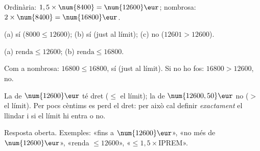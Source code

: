 \begin{solucions}
\begin{sollist}
  \item Ordinària: $1,5\times\num{8400}=\num{12600}\eur$; nombrosa:
        $2\times\num{8400}=\num{16800}\eur$.
  \item (a) sí ($\num{8000}\le\num{12600}$); \quad (b) sí (just al límit); \quad
        (c) no ($\num{12601}>\num{12600}$).
  \item (a) $\text{renda}\le\num{12600}$; \quad (b) $\text{renda}\le\num{16800}$.
  \item Com a nombrosa: $\num{16800}\le\num{16800}$, sí (just al límit). Si no ho fos:
        $\num{16800}>\num{12600}$, no.
  \item La de $\num{12600}\eur$ té dret ($\le$ el límit); la de $\num{12600,50}\eur$ no
        ($>$ el límit). Per pocs cèntims es perd el dret: per això cal definir
        \emph{exactament} el llindar i si el límit hi entra o no.
  \item Resposta oberta. Exemples: «fins a $\num{12600}\eur$», «no més de
        $\num{12600}\eur$», «renda $\le\num{12600}$», «$\le 1,5\times$IPREM».
\end{sollist}
\end{solucions}
